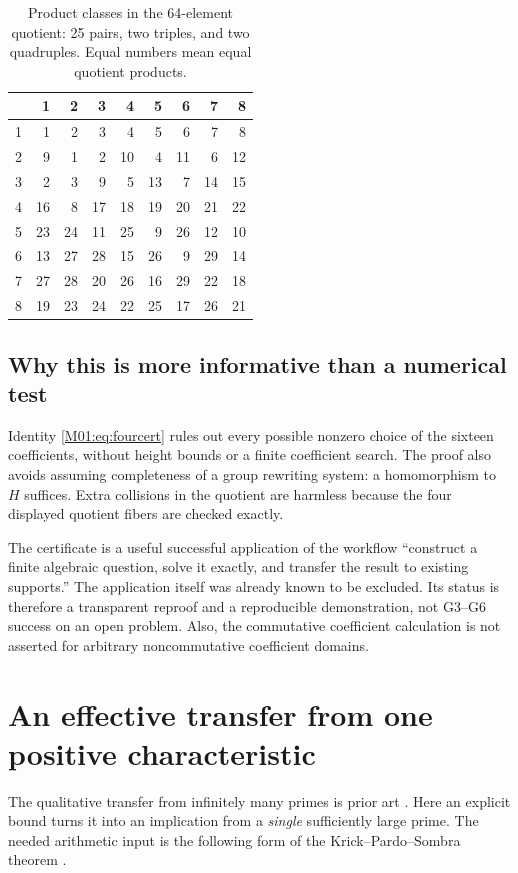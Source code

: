 \documentclass[11pt,a4paper,oneside]{report}
\theoremstyle{definition}
\theoremstyle{remark}
\begin{document}
\begin{table}[htbp]
\centering\small
\begin{tabular}{@{}c|rrrrrrrr@{}}
 & 1&2&3&4&5&6&7&8\\\hline
1&1&2&3&4&5&6&7&8\\
2&9&1&2&10&4&11&6&12\\
3&2&3&9&5&13&7&14&15\\
4&16&8&17&18&19&20&21&22\\
5&23&24&11&25&9&26&12&10\\
6&13&27&28&15&26&9&29&14\\
7&27&28&20&26&16&29&22&18\\
8&19&23&24&22&25&17&26&21
\end{tabular}
\caption{Product classes in the 64-element quotient: 25 pairs, two triples,
and two quadruples. Equal numbers mean equal quotient products.}
\label{M01:tab:quotient}
\end{table}

\subsection{Why this is more informative than a numerical test}

Identity \eqref{M01:eq:fourcert} rules out every possible nonzero choice of
the sixteen coefficients, without height bounds or a finite coefficient
search. The proof also avoids assuming completeness of a group rewriting
system: a homomorphism to $H$ suffices. Extra collisions in the quotient
are harmless because the four displayed quotient fibers are checked
exactly.

The certificate is a useful successful application of the workflow
``construct a finite algebraic question, solve it exactly, and transfer
the result to existing supports.'' The application itself was already
known to be excluded. Its status is therefore a transparent reproof and
a reproducible demonstration, not G3--G6 success on an open problem.
Also, the commutative coefficient calculation is not asserted for
arbitrary noncommutative coefficient domains.

\section{An effective transfer from one positive characteristic}\label{M01:sec:effective}

The qualitative transfer from infinitely many primes is prior art
\cite{B:MD,B:Ivanov}. Here an explicit bound turns it into an implication
from a \emph{single} sufficiently large prime. The needed arithmetic input
is the following form of the Krick--Pardo--Sombra theorem \cite{B:KPS}.
\end{document}
